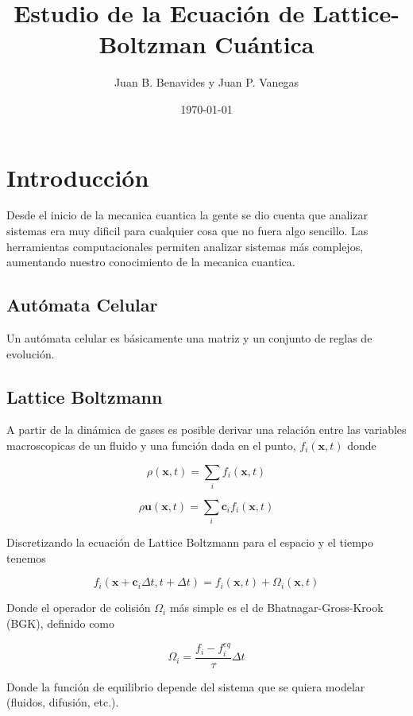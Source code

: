 \documentclass[12pts]{article}
\title{Estudio de la Ecuación de Lattice-Boltzman Cuántica}
\author{Juan B. Benavides y Juan P. Vanegas}
\date{\today}
\begin{document}
\maketitle
\section{Introducción}\label{sec:intro}
Desde el inicio de la mecanica cuantica la gente se dio cuenta que analizar sistemas era muy 
dificil para cualquier cosa que no fuera algo sencillo. Las herramientas computacionales 
permiten analizar sistemas más complejos, aumentando nuestro conocimiento de la mecanica cuantica.
\subsection{Autómata Celular}
Un autómata celular es básicamente una matriz y un conjunto de reglas de evolución.

\subsection{Lattice Boltzmann}
A partir de la dinámica de gases es posible derivar una relación entre las variables macroscopicas
de un fluido y una función dada en el punto, $f_i(\textbf{x}, t)$ donde

\begin{equation*}
    \rho(\textbf{x}, t) = \sum_i f_i(\textbf{x}, t)
\end{equation*}

\begin{equation*}
    \rho\textbf{u}(\textbf{x}, t) = \sum_i \textbf{c}_i f_i(\textbf{x}, t)
\end{equation*}

Discretizando la ecuación de Lattice Boltzmann para el espacio y el tiempo tenemos

\begin{equation*}
    f_i(\textbf{x}+\textbf{c}_i \Delta t, t+\Delta t) = f_i(\textbf{x}, t) + \Omega_i(\textbf{x}, t)
\end{equation*}

Donde el operador de colisión $\Omega_i$ más simple es el de Bhatnagar-Gross-Krook (BGK), 
definido como 

\begin{equation*}
    \Omega_i = \frac{f_i-f_i^{eq}}{\tau}\Delta t
\end{equation*}

Donde la función de equilibrio depende del sistema que se quiera modelar (fluidos, difusión, etc.).
\end{document}
